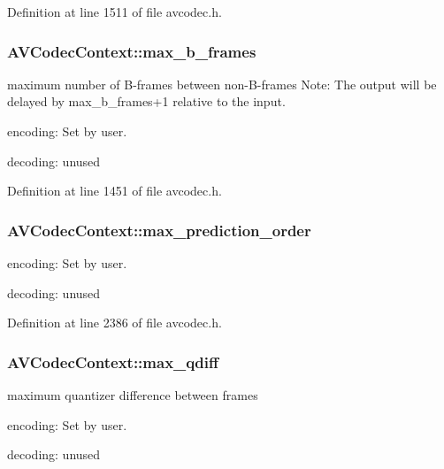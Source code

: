 Definition at line 1511 of file avcodec.\+h.

\subsubsection[{\texorpdfstring{max\+\_\+b\+\_\+frames}{max_b_frames}}]{ A\+V\+Codec\+Context\+::max\+\_\+b\+\_\+frames}\hypertarget{struct_a_v_codec_context_a3e5334a611a3e2a6a653805bb9e2d4d4}{}\label{struct_a_v_codec_context_a3e5334a611a3e2a6a653805bb9e2d4d4}
maximum number of B-\/frames between non-\/\+B-\/frames Note\+: The output will be delayed by max\+\_\+b\+\_\+frames+1 relative to the input.
\begin{DoxyItemize}
\item encoding\+: Set by user.
\item decoding\+: unused 
\end{DoxyItemize}

Definition at line 1451 of file avcodec.\+h.

\subsubsection[{\texorpdfstring{max\+\_\+prediction\+\_\+order}{max_prediction_order}}]{ A\+V\+Codec\+Context\+::max\+\_\+prediction\+\_\+order}\hypertarget{struct_a_v_codec_context_ab4a9a4ed9ea37576945eb6ef00ab3365}{}\label{struct_a_v_codec_context_ab4a9a4ed9ea37576945eb6ef00ab3365}

\begin{DoxyItemize}
\item encoding\+: Set by user.
\item decoding\+: unused 
\end{DoxyItemize}

Definition at line 2386 of file avcodec.\+h.

\subsubsection[{\texorpdfstring{max\+\_\+qdiff}{max_qdiff}}]{ A\+V\+Codec\+Context\+::max\+\_\+qdiff}\hypertarget{struct_a_v_codec_context_a08becf306e0984857919f777c4c2ebdb}{}\label{struct_a_v_codec_context_a08becf306e0984857919f777c4c2ebdb}
maximum quantizer difference between frames
\begin{DoxyItemize}
\item encoding\+: Set by user.
\item decoding\+: unused 
\end{DoxyItemize}

